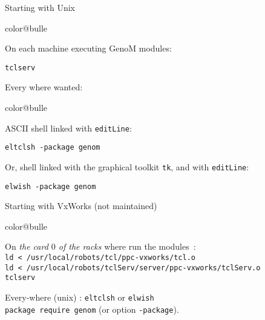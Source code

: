 \documentclass[a4paper,landscape,smooth]{show}
\begin{document}
\begin{tslide}{Starting with Unix}
   \vfill
   \begin{bitemize}{color@bulle}
      \item On each machine executing GenoM modules:\\
   \begin{cartouche}
	 \texttt{tclserv}
   \end{cartouche}

      \item Every where wanted:
	   \begin{bitemize}{color@bulle}
	       \item    ASCII shell linked with \texttt{editLine}:
\begin{cartouche}
\texttt{eltclsh -package genom}
\end{cartouche} 
	       \item Or, shell linked with the graphical toolkit
		     \texttt{tk}, and with \texttt{editLine}:
\begin{cartouche}
\texttt{elwish -package genom}
\end{cartouche} 

	   \end{bitemize}
   \end{bitemize}
   \vfill
\end{tslide}

\begin{tslide}{Starting with VxWorks (not maintained)}
   \vfill
   \begin{bitemize}{color@bulle}
      \item On {\em the card $0$ of the racks} where run the modules~:\\
	 \texttt{ld < /usr/local/robots/tcl/ppc-vxworks/tcl.o}\\
	 \texttt{ld < /usr/local/robots/tclServ/server/ppc-vxworks/tclServ.o}\\
	 \texttt{tclserv}

      \item Every-where (unix) :
	 \texttt{eltclsh} or \texttt{elwish}\\
	 \texttt{package require genom} (or option \texttt{-package}).

   \end{bitemize}

   \vfill
\end{tslide}
\end{document}
